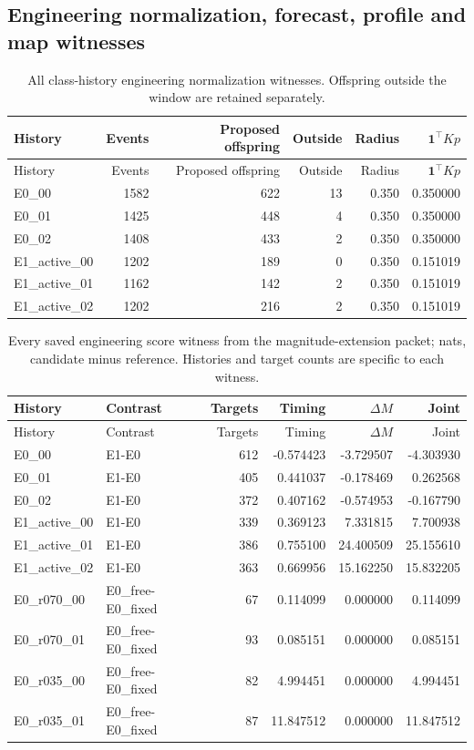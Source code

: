 \subsection{Engineering normalization, forecast, profile and map witnesses}
\label{app:audit09-engineering-witnesses}
{\small
\setlength{\tabcolsep}{3pt}
\begin{longtable}{lrrrrr}
\caption{All class-history engineering normalization witnesses. Offspring outside the window are retained separately.}\label{tab:a2-engineering-normalization}\\
\toprule
History & Events & Proposed offspring & Outside & Radius & $\mathbf1^\top Kp$\\\midrule
\endfirsthead
\toprule
History & Events & Proposed offspring & Outside & Radius & $\mathbf1^\top Kp$\\\midrule
\endhead
E0\_00 & 1582 & 622 & 13 & 0.350 & 0.350000\\
E0\_01 & 1425 & 448 & 4 & 0.350 & 0.350000\\
E0\_02 & 1408 & 433 & 2 & 0.350 & 0.350000\\
E1\_active\_00 & 1202 & 189 & 0 & 0.350 & 0.151019\\
E1\_active\_01 & 1162 & 142 & 2 & 0.350 & 0.151019\\
E1\_active\_02 & 1202 & 216 & 2 & 0.350 & 0.151019\\
\bottomrule
\end{longtable}
}

{\small
\setlength{\tabcolsep}{3pt}
\begin{longtable}{llrrrr}
\caption{Every saved engineering score witness from the magnitude-extension packet; nats, candidate minus reference. Histories and target counts are specific to each witness.}\label{tab:a2-engineering-scores}\\
\toprule
History & Contrast & Targets & Timing & $\Delta M$ & Joint\\\midrule
\endfirsthead
\toprule
History & Contrast & Targets & Timing & $\Delta M$ & Joint\\\midrule
\endhead
E0\_00 & E1-E0 & 612 & -0.574423 & -3.729507 & -4.303930\\
E0\_01 & E1-E0 & 405 & 0.441037 & -0.178469 & 0.262568\\
E0\_02 & E1-E0 & 372 & 0.407162 & -0.574953 & -0.167790\\
E1\_active\_00 & E1-E0 & 339 & 0.369123 & 7.331815 & 7.700938\\
E1\_active\_01 & E1-E0 & 386 & 0.755100 & 24.400509 & 25.155610\\
E1\_active\_02 & E1-E0 & 363 & 0.669956 & 15.162250 & 15.832205\\
E0\_r070\_00 & E0\_free-E0\_fixed & 67 & 0.114099 & 0.000000 & 0.114099\\
E0\_r070\_01 & E0\_free-E0\_fixed & 93 & 0.085151 & 0.000000 & 0.085151\\
E0\_r035\_00 & E0\_free-E0\_fixed & 82 & 4.994451 & 0.000000 & 4.994451\\
E0\_r035\_01 & E0\_free-E0\_fixed & 87 & 11.847512 & 0.000000 & 11.847512\\
\bottomrule
\end{longtable}
}

